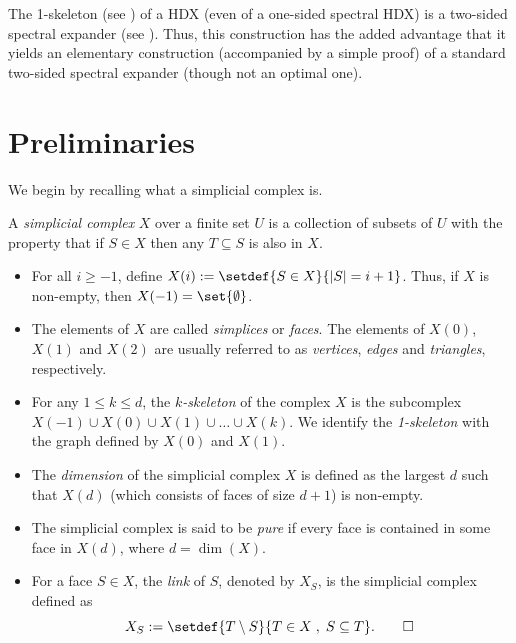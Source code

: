 \documentclass{toc}
\begin{document}
%
The 1-skeleton (see ) %
of a HDX %
(even of a one-sided spectral HDX) is a 
two-sided spectral expander (see ). %
Thus, this construction has the added advantage that it yields an elementary 
construction (accompanied by a simple proof) of a standard two-sided spectral
expander (though not an optimal one).  %
%
%
%

%

\section{Preliminaries}

We begin by recalling what a simplicial complex is. 
\begin{definition}   \label{def:simplicial-complex}
  A \emph{simplicial complex} $X$ over a finite set $U$ is a collection of subsets of $U$ with the property that if $S \in X$ then any $T \subseteq S$ is also in $X$.
  \begin{itemize}
  \item For all $i\geq -1$,
    define $X(i) := \setdef{S \in X}{|S| = i+1}$. Thus, if $X$ is
    non-empty, then $X(-1) = \set{\emptyset}$. 
  \item The elements of $X$ are called \emph{simplices} or
    \emph{faces}. The elements of $X(0)$, $X(1)$ and $X(2)$ are
    usually referred to as \emph{vertices}, \emph{edges} and
    \emph{triangles}, respectively.  %
%
%
%
%
%
%
    \item For any $1 \leq k \leq d$, the \emph{$k$-skeleton} of the complex
    $X$ is the subcomplex $X(-1) \cup X(0) \cup X(1) \cup \dots \cup X(k)$.
      We identify the \emph{1-skeleton} with the graph defined by $X(0)$ and
      $X(1)$.   %
  \item The \emph{dimension} of the simplicial complex $X$ is defined as the largest $d$ such that $X(d)$ (which consists of faces of size $d+1$) is non-empty.
  \item The simplicial complex is said to be \emph{pure} if every face
    is contained in some face in $X(d)$, where $d = \dim(X)$.
    
  \item For a face $S \in X$, the \emph{link} of $S$, denoted by
    $X_S$, is the simplicial complex defined as 
    \[
      X_S := \setdef{T \setminus S}{T\in X\;,\; S \subseteq
        T}. \qedhere\
    \]
  \end{itemize}
\end{definition}
\end{document}
